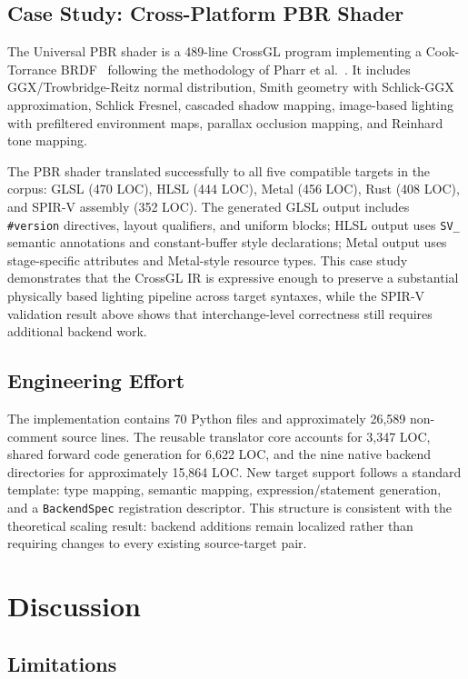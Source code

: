\documentclass{svproc}
\begin{document}
\subsection{Case Study: Cross-Platform PBR Shader}

The Universal PBR shader is a 489-line CrossGL program implementing a Cook-Torrance BRDF~\cite{cook1982reflectance} following the methodology of Pharr et al.~\cite{pharr2023pbr}. It includes GGX/Trowbridge-Reitz normal distribution, Smith geometry with Schlick-GGX approximation, Schlick Fresnel, cascaded shadow mapping, image-based lighting with prefiltered environment maps, parallax occlusion mapping, and Reinhard tone mapping.

The PBR shader translated successfully to all five compatible targets in the corpus: GLSL (470 LOC), HLSL (444 LOC), Metal (456 LOC), Rust (408 LOC), and SPIR-V assembly (352 LOC). The generated GLSL output includes \texttt{\#version} directives, layout qualifiers, and uniform blocks; HLSL output uses \texttt{SV\_} semantic annotations and constant-buffer style declarations; Metal output uses stage-specific attributes and Metal-style resource types. This case study demonstrates that the CrossGL IR is expressive enough to preserve a substantial physically based lighting pipeline across target syntaxes, while the SPIR-V validation result above shows that interchange-level correctness still requires additional backend work.

\subsection{Engineering Effort}

The implementation contains 70 Python files and approximately 26,589 non-comment source lines. The reusable translator core accounts for 3,347 LOC, shared forward code generation for 6,622 LOC, and the nine native backend directories for approximately 15,864 LOC. New target support follows a standard template: type mapping, semantic mapping, expression/statement generation, and a \texttt{BackendSpec} registration descriptor. This structure is consistent with the theoretical scaling result: backend additions remain localized rather than requiring changes to every existing source-target pair.

\section{Discussion}

\subsection{Limitations}
\end{document}

